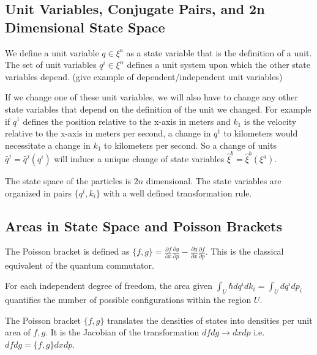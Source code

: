 \documentclass{article}
\begin{document}
\subsection{Unit Variables, Conjugate Pairs, and 2n Dimensional State Space}

\begin{defn}
	We define a unit variable $q \in \xi^a$ as a state variable that is the definition of a unit. The set of unit variables $q^i \in \xi^\alpha$ defines a unit system upon which the other state variables depend. (give example of dependent/independent unit variables)
\end{defn}

	If we change one of these unit variables, we will also have to change any other state variables that depend on the definition of the unit we changed. For example if $q^1$ defines the position relative to the x-axis in meters and $k_1$ is the velocity relative to the x-axis in meters per second, a change in $q^1$ to kilometers would necessitate a change in $k_1$ to kilometers per second. So a change of units $\hat{q}^j = \hat{q}^j(q^i)$ will induce a unique change of state variables $\hat{\xi}^b = \hat{\xi}^b(\xi^a)$.

\begin{prop}
	The state space of the particles is $2n$ dimensional. The state variables are organized in pairs $\{q^i, k_i\}$ with a well defined transformation rule.
\end{prop}

\subsection{Areas in State Space and Poisson Brackets}

\begin{defn}
	The Poisson bracket is defined as $\{f,g\} = \frac{\partial f}{\partial x}\frac{\partial g}{\partial p} - \frac{\partial g}{\partial x}\frac{\partial f}{\partial p}$. This is the classical equivalent of the quantum commutator.
\end{defn}
	
\begin{prop}
	For each independent degree of freedom, the area given $\int_U \hbar dq^i dk_i = \int_U dq^i dp_i$ quantifies the number of possible configurations within the region $U$.
\end{prop}

\begin{prop}
	The Poisson bracket $\{f, g\}$ translates the densities of states into densities per unit area of $f, g$. It is the Jacobian of the transformation $dfdg \rightarrow dxdp$ i.e. $dfdg = \{f,g\}dxdp$.
\end{prop}
	
\end{document}
